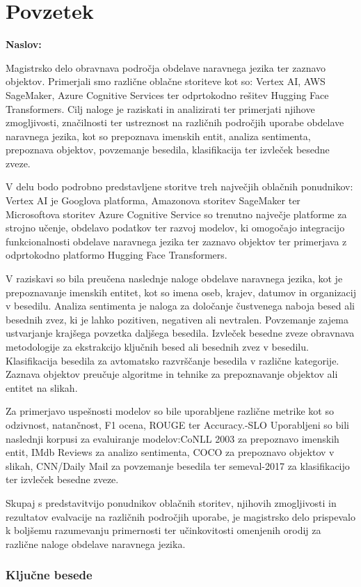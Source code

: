 \chapter{Povzetek}

\noindent\textbf{Naslov:} \ttitle
\bigskip

Magistrsko delo obravnava področja obdelave naravnega jezika ter zaznavo objektov. Primerjali smo različne oblačne storiteve kot so: Vertex AI, AWS SageMaker, Azure Cognitive Services ter odprtokodno rešitev Hugging Face Transformers. Cilj naloge je raziskati in analizirati ter primerjati njihove zmogljivosti, značilnosti ter ustreznost na različnih področjih uporabe obdelave naravnega jezika, kot so prepoznava imenskih entit, analiza sentimenta, prepoznava objektov, povzemanje besedila, klasifikacija ter izvleček besedne zveze.

V delu bodo podrobno predstavljene storitve treh največjih oblačnih ponudnikov: Vertex AI je Googlova platforma, Amazonova storitev SageMaker ter Microsoftova storitev Azure Cognitive Service so trenutno največje platforme za strojno učenje, obdelavo podatkov ter razvoj modelov, ki omogočajo integracijo funkcionalnosti obdelave naravnega jezika ter zaznavo objektov ter primerjava z odprtokodno platformo Hugging Face Transformers.

V raziskavi so bila preučena naslednje naloge obdelave naravnega jezika, kot je prepoznavanje imenskih entitet, kot so imena oseb, krajev, datumov in organizacij v besedilu.
Analiza sentimenta je naloga za določanje čustvenega naboja besed ali besednih zvez, ki je lahko pozitiven, negativen ali nevtralen. Povzemanje zajema ustvarjanje krajšega povzetka daljšega besedila. Izvleček besedne zveze obravnava metodologije za ekstrakcijo ključnih besed ali besednih zvez v besedilu. 
Klasifikacija besedila za avtomatsko razvrščanje besedila v različne kategorije. Zaznava objektov preučuje algoritme in tehnike za prepoznavanje objektov ali entitet na slikah.

Za primerjavo uspešnosti modelov so bile uporabljene različne metrike kot so odzivnost, natančnost, F1 ocena, ROUGE ter Accuracy.-SLO Uporabljeni so bili naslednji korpusi za  evaluiranje modelov:CoNLL 2003 za prepoznavo imenskih entit, IMdb Reviews za analizo sentimenta, COCO za prepoznavo objektov v slikah, CNN/Daily Mail za povzemanje besedila ter semeval-2017 za klasifikacijo ter izvleček besedne zveze.

Skupaj s predstavitvijo ponudnikov oblačnih storitev, njihovih zmogljivosti in rezultatov evalvacije na različnih področjih uporabe, je magistrsko delo prispevalo k boljšemu razumevanju primernosti ter učinkovitosti omenjenih orodij za različne naloge obdelave naravnega jezika.

\subsection*{Ključne besede}
\textit{\tkeywords}
\clearemptydoublepage 